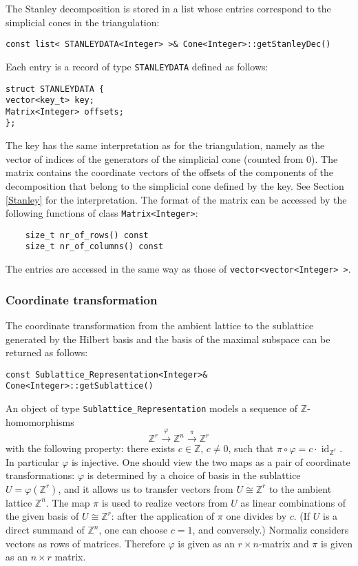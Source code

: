 \documentclass[12pt,a4paper]{scrartcl}
\theoremstyle{definition}
\let\phi=\varphi
\def\ZZ{{\mathbb Z}}
\begin{document}
\begin{small}
The Stanley decomposition is stored in a list whose entries correspond to the simplicial cones in the triangulation:
\begin{Verbatim}
const list< STANLEYDATA<Integer> >& Cone<Integer>::getStanleyDec()
\end{Verbatim}
Each entry is a record of type \verb|STANLEYDATA| defined as follows:
\begin{Verbatim}
struct STANLEYDATA {
vector<key_t> key;
Matrix<Integer> offsets;
};
\end{Verbatim}
The key has the same interpretation as for the triangulation, namely as the vector of indices of the generators of the simplicial cone (counted from $0$). The matrix contains the coordinate vectors of the offsets of the components of the decomposition that belong to the simplicial cone defined by the key. See Section \ref{Stanley} for the interpretation. The format of the matrix can be accessed by the following functions of class \verb|Matrix<Integer>|:
\begin{Verbatim}
    size_t nr_of_rows() const
    size_t nr_of_columns() const    
\end{Verbatim}
The entries are accessed in the same way as those of \verb|vector<vector<Integer> >|.

\subsubsection{Coordinate transformation}\label{coord}

The coordinate transformation from the ambient lattice to the sublattice generated by the Hilbert basis and the basis of the maximal subspace can be returned as follows:
\begin{Verbatim}
const Sublattice_Representation<Integer>& Cone<Integer>::getSublattice()
\end{Verbatim}
An object of type \verb|Sublattice_Representation| models a sequence of $\ZZ$-homomorphisms
$$
\ZZ^r\xrightarrow{\phi}\ZZ^n\xrightarrow{\pi}\ZZ^r
$$
with the following property: there exists $c\in\ZZ$, $c\neq 0$, such that $\pi\circ \phi=c\cdot\operatorname{id}_{\ZZ^r}$. In particular $\phi$ is injective. One should view the two maps as a pair of coordinate transformations: $\phi$ is determined by a choice of basis in the sublattice $U=\phi(\ZZ^r)$, and it allows us to transfer vectors from $U\cong \ZZ^r$ to the ambient lattice $\ZZ^n$. The map $\pi$ is used to realize vectors from $U$ as linear combinations of the given basis of $U\cong\ZZ^r$: after the application of $\pi$ one divides by $c$. (If $U$ is a direct summand of $\ZZ^n$, one can choose $c=1$, and conversely.) Normaliz considers vectors as rows of matrices. Therefore $\phi$ is given as an $r\times n$-matrix and $\pi$ is given as an $n\times r$ matrix.


\end{small}
\end{document}

